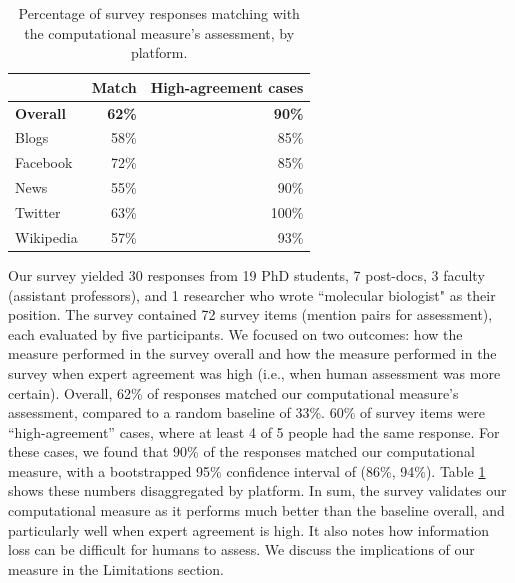 \documentclass[letterpaper]{article} %
\begin{document}
\begin{table}[t]
    \centering
    \begin{tabular}{@{}l|r|r@{}}
     & \textbf{Match} & \textbf{High-agreement cases} \\ \hline
    \textbf{Overall} & \textbf{62\%} & \textbf{90\%} \\ \hline
    {Blogs} & 58\% & 85\%\\ %
    {Facebook} & 72\% & 85\% \\ %
    {News} & 55\% & 90\% \\ %
    {Twitter} & 63\% & 100\% \\ %
    {Wikipedia} & 57\% & 93\% %
    \end{tabular}
    \caption{Percentage of survey responses matching with the computational measure's assessment, by platform.}
    \label{tab:survey_items_platforms}
\end{table}


Our survey yielded 30 responses from 19 PhD students, 7 post-docs, 3 faculty (assistant professors), and 1 researcher who wrote ``molecular biologist" as their position. The survey contained 72 survey items (mention pairs for assessment), each evaluated by five participants. We focused on two outcomes: how the measure performed in the survey overall and how the measure performed in the survey when expert agreement was high (i.e., when human assessment was more certain).
Overall, 62\% of responses matched our computational measure's assessment, compared to a random baseline of 33\%. 60\% of survey items were ``high-agreement'' cases, where at least 4 of 5 people had the same response. For these cases, we found that 90\% of the responses matched our computational measure, with a bootstrapped 95\% confidence interval of (86\%, 94\%). Table \ref{tab:survey_items_platforms} shows these numbers disaggregated by platform. 
In sum, the survey validates our computational measure as it performs much better than the baseline overall, and particularly well when expert agreement is high. It also notes how information loss can be difficult for humans to assess. We discuss the implications of our measure in the Limitations section.
\end{document}
